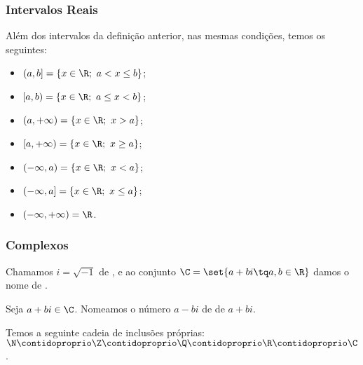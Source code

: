     \begin{frame}
        \frametitle{Intervalos Reais} 
        Além dos intervalos da definição anterior, nas mesmas condições, temos os seguintes:
        
        \begin{itemize}
        \item $ (a,b] = \{ x \in \R ; \  a < x \leq b \}$;
        \item $ [a,b) = \{ x \in \R ; \  a \leq x < b \}$; \pause
        \item $ (a,+\infty) = \{ x \in \R ; \   x > a \}$;
        \item $ [a,+\infty) = \{ x \in \R ; \   x \geq a \}$;
        \item $ (-\infty,a) = \{ x \in \R ; \   x < a \}$;
        \item $ (-\infty,a] = \{ x \in \R ; \   x \leq a \}$;
        \item $ (-\infty, +\infty) = \R$.
        \end{itemize}
        \end{frame}
        
        
        
    \begin{frame}
    \frametitle{Complexos} 
    \begin{definicao}
    Chamamos $i = \sqrt {-1}$ de , e ao conjunto
    $\C = \set{ a+bi \tq a,b \in \R}$ damos o nome de .
    \end{definicao}\pause
    
    Seja $a+bi \in \C$. Nomeamos o número $a-bi$ de  de
    $a+bi$.
    
    Temos a seguinte cadeia de inclusões próprias: $\N \contidoproprio \Z
    \contidoproprio \Q \contidoproprio \R \contidoproprio \C$.
    \end{frame}
    
    
    
